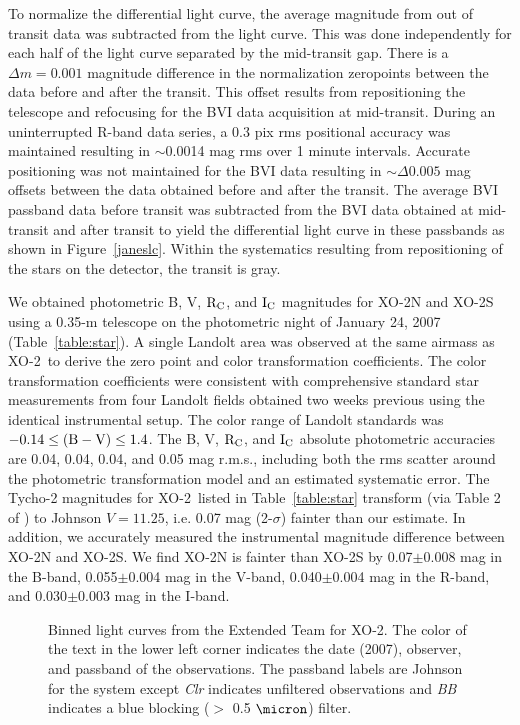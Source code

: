 \documentclass{emulateapj}
\newcommand{\xon}{XO-2}
\begin{document}
To normalize the differential light curve, the average magnitude from
out of transit data was subtracted from the light curve.  This was
done independently for each half of the light curve separated by the
mid-transit gap.  There is a $\Delta m=0.001$ magnitude difference in
the normalization zeropoints between the data before and after the
transit.  This offset results from repositioning the telescope and
refocusing for the BVI data acquisition at mid-transit.  During an
uninterrupted R-band data series, a 0.3 pix rms positional accuracy was
maintained resulting in $\sim$0.0014 mag rms over 1 minute intervals.
Accurate positioning was not maintained for the BVI data resulting in
$\sim \Delta 0.005$ mag offsets between the data obtained before and
after the transit.  The average BVI passband data before transit was
subtracted from the BVI data obtained at mid-transit and after transit
to yield the differential light curve in these passbands as shown in
Figure~\ref{janeslc}.  Within the systematics resulting from
repositioning of the stars on the detector, the transit is gray.

We obtained photometric B, V, ${\rm R_C}$, and ${\rm I_C}$ magnitudes
for \xon N and \xon S using a 0.35-m telescope on
the photometric night of January 24, 2007 (Table~\ref{table:star}).  A single
Landolt area \citep{LAN92} was observed at the same airmass as \xon\ to
derive the zero point and color transformation coefficients.  The
color transformation coefficients were consistent with comprehensive
standard star measurements from four Landolt fields obtained two weeks
previous using the identical instrumental setup.  The color range of
Landolt standards was $-0.14\leq {\rm (B-V)} \leq 1.4$.  The B, V,
${\rm R_C}$, and ${\rm I_C}$ absolute photometric accuracies are 0.04,
0.04, 0.04, and 0.05 mag r.m.s., including both the rms scatter around
the photometric transformation model and an estimated systematic
error.  The Tycho-2 magnitudes for \xon\ listed in Table~\ref{table:star} transform
(via Table 2 of \citet{BES00}) to Johnson $V = 11.25$, i.e. 0.07 mag
(2-$\sigma$) fainter than our estimate.
In addition, we accurately measured the instrumental magnitude difference between \xon N and \xon S.  We find \xon N is fainter than \xon S by 0.07$\pm$0.008 mag in the B-band, 0.055$\pm$0.004 mag in the V-band, 0.040$\pm$0.004 mag in the R-band, and 0.030$\pm$0.003 mag in the I-band.

\begin{figure}
\caption{Binned light curves from the Extended Team for \xon.  The color of the text in the lower left corner indicates the date (2007), observer, and passband of the observations.  The passband labels are Johnson for the system except {\it Clr} indicates unfiltered observations and {\it BB} indicates a blue blocking ($>$ 0.5 $\micron$) filter. \label{et436}}
\end{figure}
\end{document}
